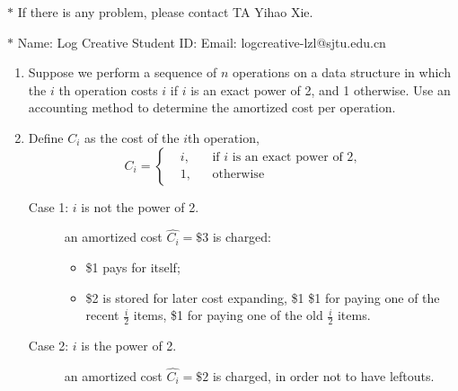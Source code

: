 \documentclass[12pt,a4paper]{article}
\makeatletter
\newtheorem*{solution}{Solution}
\theoremstyle{definition}
\renewenvironment{solution}[1][Solution] {\par\pushQED{\qed}\normalfont\topsep6\p@\@plus6\p@\relax\trivlist\item[\hskip\labelsep\bfseries#1\@addpunct{.}]\ignorespaces}{\popQED\endtrivlist\@endpefalse} \makeatother
\makeatother
\begin{document}
\noindent

\noindent{}
\begin{center}
\footnotesize{\color{red}$*$ If there is any problem, please contact TA Yihao Xie. }

\footnotesize{\color{blue}$*$ Name: Log Creative  \quad Student ID:  \quad Email: logcreative-lzl@sjtu.edu.cn}
\end{center}
\begin{enumerate}
	\item Suppose we perform a sequence of $n$ operations on a data structure in which the $i$ th operation costs $i$ if $i$ is an exact power of 2, and 1 otherwise. Use an accounting method to determine the amortized cost per operation.
	
	\begin{solution}
		Define $C_i$ as the cost of the $i$th operation,
		\begin{equation*}
			C_i=\left\{\begin{aligned}
				&i, &&\text{if }i\text{ is an exact power of 2},\\
				&1, &&\text{otherwise}
			\end{aligned}\right.
		\end{equation*}
		\begin{description}
			\item[Case 1: $i$ is not the power of 2.] an amortized cost $\hat{C_i}=\$3$ is charged:
			\begin{itemize}
				\item \$1 pays for itself;
				\item \$2 is stored for later cost expanding, \$1 \$1 for paying one of the recent $\frac{i}{2}$ items, \$1 for paying one of the old $\frac{i}{2}$ items.
			\end{itemize} 
			\item[Case 2: $i$ is the power of 2.]  an amortized cost $\hat{C_i}=\$2$ is charged, in order not to have leftouts.


\end{description}
\end{solution}
\end{enumerate}
\end{document}
